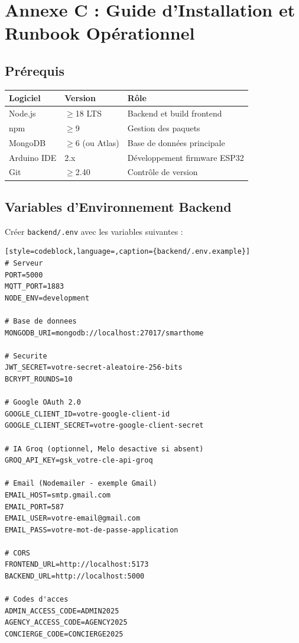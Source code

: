 \chapter{Annexe C : Guide d'Installation et Runbook Opérationnel}

\section{Prérequis}

\begin{center}
\begin{tabular}{lll}
\toprule
\textbf{Logiciel} & \textbf{Version} & \textbf{Rôle} \\
\midrule
Node.js        & $\geq$18 LTS       & Backend et build frontend \\
npm            & $\geq$9            & Gestion des paquets \\
MongoDB        & $\geq$6 (ou Atlas) & Base de données principale \\
Arduino IDE    & 2.x                & Développement firmware ESP32 \\
Git            & $\geq$2.40         & Contrôle de version \\
\bottomrule
\end{tabular}
\end{center}

\section{Variables d'Environnement Backend}

Créer \texttt{backend/.env} avec les variables suivantes :

\begin{lstlisting}[style=codeblock,language=,caption={backend/.env.example}]
# Serveur
PORT=5000
MQTT_PORT=1883
NODE_ENV=development

# Base de donnees
MONGODB_URI=mongodb://localhost:27017/smarthome

# Securite
JWT_SECRET=votre-secret-aleatoire-256-bits
BCRYPT_ROUNDS=10

# Google OAuth 2.0
GOOGLE_CLIENT_ID=votre-google-client-id
GOOGLE_CLIENT_SECRET=votre-google-client-secret

# IA Groq (optionnel, Melo desactive si absent)
GROQ_API_KEY=gsk_votre-cle-api-groq

# Email (Nodemailer - exemple Gmail)
EMAIL_HOST=smtp.gmail.com
EMAIL_PORT=587
EMAIL_USER=votre-email@gmail.com
EMAIL_PASS=votre-mot-de-passe-application

# CORS
FRONTEND_URL=http://localhost:5173
BACKEND_URL=http://localhost:5000

# Codes d'acces
ADMIN_ACCESS_CODE=ADMIN2025
AGENCY_ACCESS_CODE=AGENCY2025
CONCIERGE_CODE=CONCIERGE2025
\end{lstlisting}

